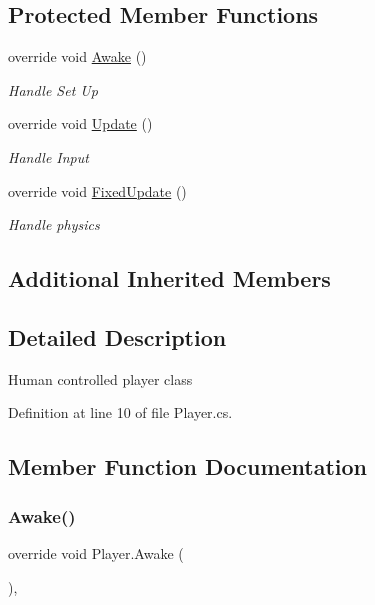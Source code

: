 \subsection*{Protected Member Functions}
\begin{DoxyCompactItemize}
\item 
override void \mbox{\hyperlink{class_player_a21d9f4bbd86a4a1aaa8844917270aefb}{Awake}} ()
\begin{DoxyCompactList}\small\item\em Handle Set Up \end{DoxyCompactList}\item 
override void \mbox{\hyperlink{class_player_abccf91b671f93492dfdb704ddf894ae3}{Update}} ()
\begin{DoxyCompactList}\small\item\em Handle Input \end{DoxyCompactList}\item 
override void \mbox{\hyperlink{class_player_a9f719f4557355ff498cc7ff6d3723a84}{Fixed\+Update}} ()
\begin{DoxyCompactList}\small\item\em Handle physics \end{DoxyCompactList}\end{DoxyCompactItemize}
\subsection*{Additional Inherited Members}


\subsection{Detailed Description}
Human controlled player class 



Definition at line 10 of file Player.\+cs.



\subsection{Member Function Documentation}
\mbox{\label{class_player_a21d9f4bbd86a4a1aaa8844917270aefb}} 
\subsubsection{\texorpdfstring{Awake()}{Awake()}}
{\footnotesize\ttfamily override void Player.\+Awake (\begin{DoxyParamCaption}{ }\end{DoxyParamCaption})\hspace{0.3cm}{\ttfamily [protected]}, {\ttfamily [virtual]}}



